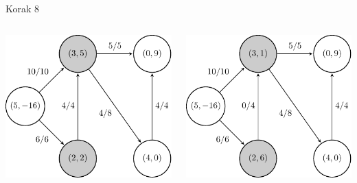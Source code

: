 \documentclass{beamer}
\begin{document}
\begin{frame}{Korak 8}
    \begin{columns}
        \begin{column}{0.5\textwidth}
            \centering
            \includegraphics[scale=0.7]{../writing/images/graf2-9.pdf}
        \end{column}

        \begin{column}{0.5\textwidth}
            \centering
            \includegraphics[scale=0.7]{../writing/images/graf2-10.pdf}
        \end{column}
    \end{columns}
\end{frame}
\end{document}
